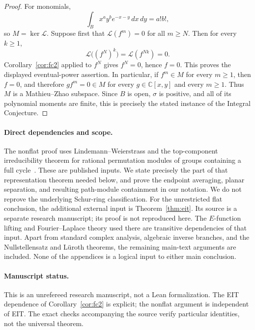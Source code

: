 \documentclass[11pt]{article}
\numberwithin{equation}{section}
\theoremstyle{definition}\newtheorem{definition}[theorem]{Definition}
\theoremstyle{remark}\newtheorem{remark}[theorem]{Remark}
\newcommand{\C}{\mathbb C}
\newcommand{\Lfac}{\mathcal L}
\newcommand{\dd}{\,d}
\begin{document}
\begin{proof}
For monomials,
\[
 \int_B x^a y^b e^{-x-y}\dd x\dd y=a!b!,
\]
so $M=\ker\Lfac$. Suppose first that
$\Lfac(f^m)=0$ for all $m\ge N$. Then for every $k\ge1$,
\[
 \Lfac\bigl((f^N)^k\bigr)=\Lfac(f^{Nk})=0.
\]
Corollary~\ref{cor:fc2} applied to $f^N$ gives $f^N=0$, hence $f=0$.
This proves the displayed eventual-power assertion. In particular, if
$f^m\in M$ for every $m\ge1$, then $f=0$, and therefore
$gf^m=0\in M$ for every $g\in\C[x,y]$ and every $m\ge1$.
Thus $M$ is a Mathieu--Zhao subspace. Since $B$ is open, $\sigma$ is
positive, and all of its polynomial moments are finite, this is precisely
the stated instance of the Integral Conjecture.
\end{proof}

\paragraph{Direct dependencies and scope.}
The nonflat proof uses Lindemann--Weierstrass and the top-component
irreducibility theorem for rational permutation modules of groups
containing a full cycle~\cite[Theorem~3.1 and Section~4.1]{PM}.
These are published inputs. We state precisely the part
of that representation theorem needed below, and prove the endpoint
averaging, planar separation, and resulting path-module containment in
our notation. We do not reprove the underlying Schur-ring classification.
For the unrestricted flat conclusion, the additional external input is
Theorem~\ref{thm:eit}. Its source is a separate research manuscript;
its proof is not reproduced here. The $E$-function lifting and
Fourier--Laplace theory used there are transitive dependencies of that
input. Apart from standard complex analysis, algebraic inverse branches,
and the Nullstellensatz and L\"uroth theorems, the remaining main-text
arguments are included. None of the appendices is a logical input to
either main conclusion.
\paragraph{Manuscript status.}
This is an unrefereed research manuscript, not a Lean formalization.
The EIT dependence of Corollary~\ref{cor:fc2} is explicit; the nonflat
argument is independent of EIT. The exact checks accompanying the source
verify particular identities, not the universal theorem.
\end{document}
